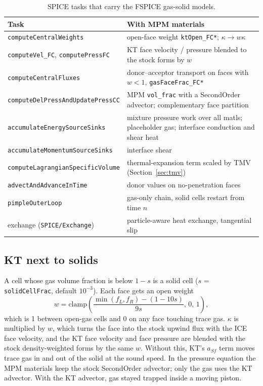 \documentclass[11pt]{article}
\newcommand{\code}[1]{\texttt{\small #1}}
\newcommand{\file}[1]{\texttt{\small\color{Moss}#1}}
\begin{document}
\begin{table}[h]
\centering\small
\begin{tabularx}{\linewidth}{@{}l X@{}}
\toprule
\textbf{Task} & \textbf{With MPM materials} \\
\midrule
\code{computeCentralWeights} & open-face weight \code{ktOpen\_FC*}; $\kappa \to w\kappa$ \\
\code{computeVel\_FC}, \code{computePressFC} & KT face velocity / pressure blended to the stock forms by $w$ \\
\code{computeCentralFluxes} & donor--acceptor transport on faces with $w<1$, \code{gasFaceFrac\_FC*} \\
\code{computeDelPressAndUpdatePressCC} & MPM \code{vol\_frac} with a SecondOrder advector; complementary face partition \\
\code{accumulateEnergySourceSinks} & mixture pressure work over all matls; placeholder gas; interface conduction and shear heat \\
\code{accumulateMomentumSourceSinks} & interface shear \\
\code{computeLagrangianSpecificVolume} & thermal-expansion term scaled by $\mathrm{TMV}$ (Section~\ref{sec:tmv}) \\
\code{advectAndAdvanceInTime} & donor values on no-penetration faces \\
\code{pimpleOuterLoop} & gas-only chain, solid cells restart from time $n$ \\
exchange (\file{SPICE/Exchange}) & particle-aware heat exchange, tangential slip \\
\bottomrule
\end{tabularx}
\caption{SPICE tasks that carry the FSPICE gas-solid models.}\label{tab:fspice-tasks}
\end{table}

\subsection{KT next to solids}

A cell whose gas volume fraction is below $1-s$ is a solid cell ($s$ = \code{solidCellFrac},
default $10^{-3}$). Each face gets an open weight
\begin{equation}
  w = \mathrm{clamp}\!\left(\frac{\min(f_L,f_R) - (1-10s)}{9s},\,0,\,1\right),
\end{equation}
which is 1 between open-gas cells and 0 on any face touching trace gas. $\kappa$ is multiplied
by $w$, which turns the face into the stock upwind flux with the ICE face velocity, and the KT
face velocity and face pressure are blended with the stock density-weighted forms by the same
$w$. Without this, KT's $a_{Sf}$ term moves trace gas in and out of the solid at the sound
speed. In the pressure equation the MPM materials keep the stock SecondOrder advector; only
the gas uses the KT advector. With the KT advector, gas stayed trapped inside a moving piston.
\end{document}
